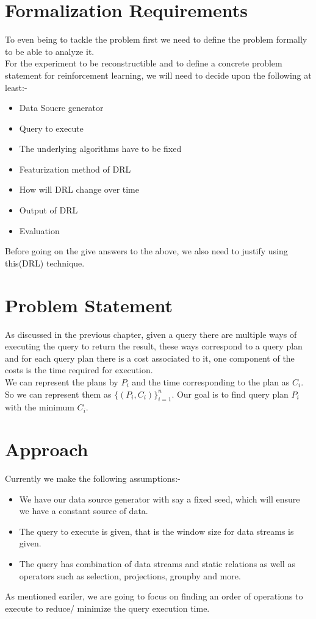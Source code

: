 \section{Formalization Requirements}
To even being to tackle the problem first we need to define the problem formally to be able to analyze it.
\\ For the experiment to be reconstructible and to define a concrete problem statement for reinforcement learning, we will need to decide upon the following at least:-
\begin{itemize}
    \item Data Soucre generator
    \item Query to execute
    \item The underlying algorithms have to be fixed
    \item Featurization method of DRL
    \item How will DRL change over time
    \item Output of DRL
    \item Evaluation
\end{itemize}
Before going on the give answers to the above, we also need to justify using this(DRL) technique.

\section{Problem Statement}
As discussed in the previous chapter, given a query there are multiple ways of executing the query to return the result, these ways correspond to a query plan and for each query plan there is a cost associated to it, one component of the costs is the time required for execution.\\
We can represent the plans by $P_{i}$ and the time corresponding to the plan as $C_{i}$. So we can represent them as $\{(P_{i},C_{i})\}_{i=1}^{n}$. Our goal is to find query plan $P_{i}$ with the minimum $C_{i}$.

\section{Approach}
Currently we make the following assumptions:-
\begin{itemize}
    \item We have our data source generator with say a fixed seed, which will ensure we have a constant source of data.
    \item The query to execute is given, that is the window size for data streams is given.
    \item The query has combination of data streams and static relations as well as operators such as selection, projections, groupby and more.
\end{itemize}
As mentioned eariler, we are going to focus on finding an order of operations to execute to reduce/ minimize the query execution time.

